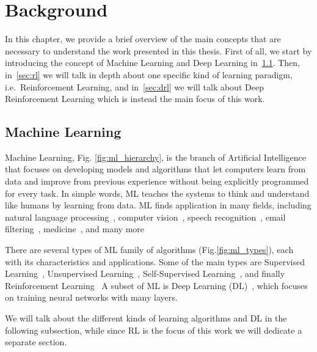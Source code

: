 
\chapter{Background}
\label{ch:background}
In this chapter, we provide a brief overview of the main concepts that are necessary to understand the work presented in this thesis.
First of all, we start by introducing the concept of Machine Learning and Deep Learning in~\ref{sec:machine_learning}.
Then, in~\ref{sec:rl} we will talk in depth about one specific kind of learning paradigm, i.e.\ Reinforcement Learning, and in~\ref{sec:drl} we will talk about Deep Reinforcement Learning which is instead the main focus of this work.

\section{Machine Learning}
\label{sec:machine_learning}

Machine Learning, Fig. \ref{fig:ml_hierarchy}, is the branch of Artificial Intelligence that focuses on developing models and algorithms that let computers learn from data and improve from previous experience without being explicitly programmed for every task.
In simple words, ML teaches the systems to think and understand like humans by learning from data.
ML finds application in many fields, including natural language processing~\citep{devlin2018bert}, computer vision~\citep{he2016deep}, speech recognition~\citep{hinton2012deep}, email filtering~\citep{carreras2001boosting}, medicine~\citep{esteva2017dermatologist}, and many more

There are several types of ML family of algorithms (Fig.\ref{fig:ml_types}), each with its characteristics and applications.
Some of the main types are Supervised Learning~\citep{kotsiantis2007supervised}, Unsupervised 
Learning~\citep{hastie2009elements}, Self-Supervised Learning~\citep{balestriero2023cookbook}, and finally Reinforcement Learning~\citep{sutton1998introduction}
A subset of ML is Deep Learning (DL)~\citep{lecun2015deep}, which focuses on training neural networks with many layers.

We will talk about the different kinds of learning algorithms and DL in the following subsection, while since RL is the focus of this work we will dedicate a separate section.




